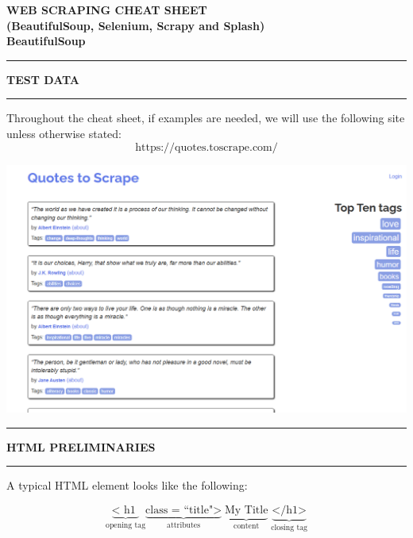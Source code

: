 \documentclass[8pt]{extarticle}
\newcommand{\heading}[1]{%
    \noindent
    \rule{\linewidth}{0.4pt}
    \begin{center}
        \vspace{-1ex}
        \textbf{#1}        
        \vspace{-2.5ex}
    \end{center}
    \rule{\linewidth}{0.4pt}
}
\begin{document}
\thispagestyle{empty} 

\begin{center}   
{\huge\textbf{WEB SCRAPING CHEAT SHEET}}\\
\vspace*{0.15cm}
{\huge\textbf{(BeautifulSoup,  Selenium, Scrapy and Splash)}}\\
\vspace*{0.75cm}
{\huge\textbf{BeautifulSoup}}
\vspace*{0.75cm}
\end{center}

\begin{multicols}{3}
\setlength{\columnseprule}{1pt} %

\heading{TEST DATA}

Throughout the cheat sheet, if examples are needed, we will use the following site unless otherwise stated:
\[\text{https://quotes.toscrape.com/}\]
\begin{center}
    \includegraphics[width=1\columnwidth]{images/quotes-to-scrape.png}
\end{center}

\heading{HTML PRELIMINARIES}

A typical HTML element looks like the following:

\[\underbrace{\text{< h1 }}_{\text{opening tag}}\!\!\!\underbrace{\text{class = ``title">}}_{\text{attributes}}\;\underbrace{\text{My Title}}_{\text{content}}\; \underbrace{\text{</h1>}}_{\text{closing tag}}\]


\end{multicols}
\end{document}
